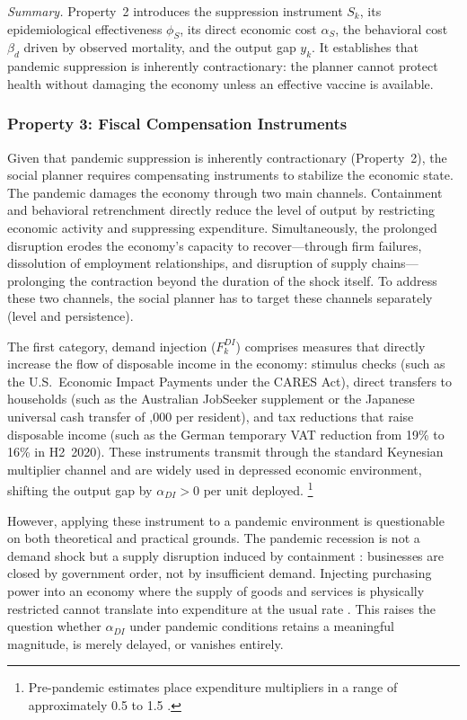 \documentclass[12pt, a4paper]{article}
\begin{document}
\medskip
\noindent\textit{Summary.} Property~2 introduces the suppression instrument $S_k$, its epidemiological effectiveness $\phi_S$, its direct economic cost $\alpha_S$, the behavioral cost $\beta_d$ driven by observed mortality, and the output gap $y_k$. It establishes that pandemic suppression is inherently contractionary: the planner cannot protect health without damaging the economy unless an effective vaccine is available.

\subsubsection*{Property 3: Fiscal Compensation Instruments}

Given that pandemic suppression is inherently contractionary (Property~2), the social planner requires compensating instruments to stabilize the economic state. The pandemic damages the economy through two main channels. Containment and behavioral retrenchment directly reduce the level of output by restricting economic activity and suppressing expenditure. Simultaneously, the prolonged disruption erodes the economy's capacity to recover---through firm failures, dissolution of employment relationships, and disruption of supply chains---prolonging the contraction beyond the duration of the shock itself. To address these two channels, the social planner has to target these channels separately (level and persistence).

The first category, demand injection ($F^{DI}_k$) comprises measures that directly increase the flow of disposable income in the economy: stimulus checks (such as the U.S.\ Economic Impact Payments under the CARES Act), direct transfers to households (such as the Australian JobSeeker supplement or the Japanese universal cash transfer of ,000 per resident), and tax reductions that raise disposable income (such as the German temporary VAT reduction from 19\% to 16\% in H2~2020). These instruments transmit through the standard Keynesian multiplier channel and are widely used in depressed economic environment, shifting the output gap by $\alpha_{DI} > 0$ per unit deployed. \footnote{Pre-pandemic estimates place expenditure multipliers in a range of approximately 0.5 to 1.5 \citep{ramey2018, blanchard2002}.}

However, applying these instrument to a pandemic environment is questionable on both theoretical and practical grounds. The pandemic  recession is not a demand shock but a supply disruption induced by containment \citep{guerrieri2022}: businesses are closed by government order, not by insufficient demand. Injecting purchasing power into an economy where the supply of goods and services is physically restricted cannot translate into expenditure at the usual rate \citep{chetty2020, coibion2020}. This raises the question whether $\alpha_{DI}$ under pandemic conditions retains a meaningful magnitude, is merely delayed, or vanishes entirely.
\end{document}
